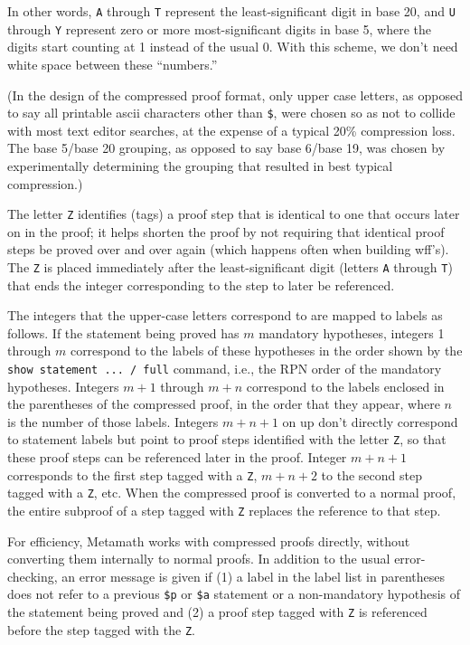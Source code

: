 In other words, \texttt{A} through \texttt{T} represent the
least-significant digit in base 20, and \texttt{U} through \texttt{Y}
represent zero or more most-significant digits in base 5, where the
digits start counting at 1 instead of the usual 0. With this scheme, we
don't need white space between these ``numbers.''

(In the design of the compressed proof format, only upper case letters,
as opposed to say all printable {\sc ascii} characters other than
\texttt{\$}, were chosen so as not to collide with most text editor
searches, at the expense of a typical 20\% compression
loss.  The base 5/base 20 grouping, as opposed to say base 6/base 19,
was chosen by experimentally determining the grouping that resulted in
best typical compression.)

The letter \texttt{Z} identifies (tags) a proof step that is identical to one
that occurs later on in the proof; it helps shorten the proof by not requiring
that identical proof steps be proved over and over again (which happens often
when building wff's).  The \texttt{Z} is placed immediately after the
least-significant digit (letters \texttt{A} through \texttt{T}) that ends the integer
corresponding to the step to later be referenced.

The integers that the upper-case letters correspond to are mapped to labels as
follows.  If the statement being proved has $m$ mandatory hypotheses, integers
1 through $m$ correspond to the labels of these hypotheses in the order shown
by the \texttt{show statement ... / full} command, i.e., the RPN order of the mandatory
hypotheses.  Integers $m+1$ through $m+n$ correspond to the labels enclosed in
the parentheses of the compressed proof, in the order that they appear, where
$n$ is the number of those labels.  Integers $m+n+1$ on up don't directly
correspond to statement labels but point to proof steps identified with the
letter \texttt{Z}, so that these proof steps can be referenced later in the
proof.  Integer $m+n+1$ corresponds to the first step tagged with a \texttt{Z},
$m+n+2$ to the second step tagged with a \texttt{Z}, etc.  When the compressed
proof is converted to a normal proof, the entire subproof of a step tagged
with \texttt{Z} replaces the reference to that step.

For efficiency, Metamath works with compressed proofs directly, without
converting them internally to normal proofs.  In addition to the usual
error-checking, an error message is given if (1) a label in the label list in
parentheses does not refer to a previous \texttt{\$p} or \texttt{\$a} statement or a
non-mandatory hypothesis of the statement being proved and (2) a proof step
tagged with \texttt{Z} is referenced before the step tagged with the \texttt{Z}.

